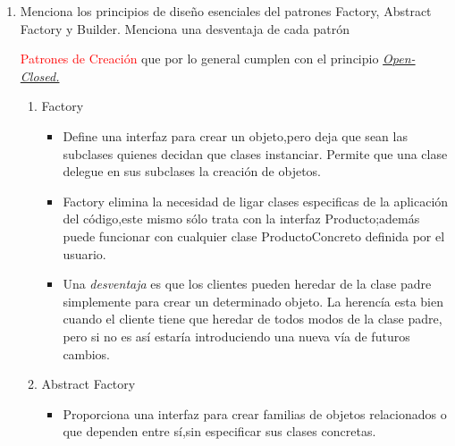 \documentclass[a4paper,10pt]{article}
\begin{document}
\begin{enumerate}
    
    \item Menciona los principios de diseño esenciales del patrones Factory, Abstract Factory y Builder. Menciona una desventaja de cada patrón 
    
    \textcolor{red}{Patrones de Creación} que por lo general cumplen con el principio \underline{\textit{Open-Closed.}}

        \begin{enumerate}
            \item \colorbox[rgb]{0.53, 0.81, 0.98}{Factory}
            \begin{itemize}

                \item [\Checkmark] Define una interfaz para crear un objeto,pero deja que sean las subclases quienes decidan que clases instanciar.
                Permite que una clase delegue en sus subclases la creación de objetos.

                \item [\Checkmark] Factory elimina la necesidad de ligar clases especificas de la aplicación del código,este mismo sólo trata
                      con la interfaz Producto;además puede funcionar con cualquier clase ProductoConcreto definida por el usuario.\\
                 
     
                \item [\XSolidBrush ] Una \textit{desventaja} es que los clientes pueden heredar de la clase padre simplemente para crear un determinado objeto.
                      La herencía esta bien cuando el cliente tiene que heredar de todos modos de la clase padre, pero si no es así estaría introduciendo una
                      nueva vía de futuros cambios. \\
                      
            \end{itemize}

            
            \item \colorbox[rgb]{1.0, 0.71, 0.76}{Abstract Factory}
            \begin{itemize}

                \item [\Checkmark] Proporciona una interfaz para crear familias de objetos relacionados o que dependen entre sí,sin especificar sus clases concretas.
                


\end{itemize}
\end{enumerate}
\end{enumerate}
\end{document}
